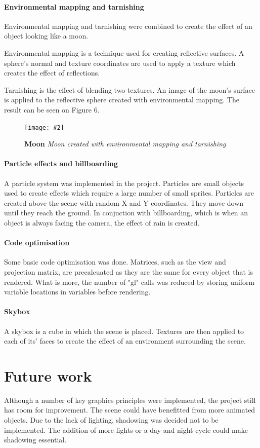 \documentclass[10pt, a4paper]{article}
\newcommand{\figuremacro}[5]{
    \begin{figure}[#1]
        \centering
        \texttt{[image: \#2]}
        \caption[#3]{\textbf{#3}#4}
        \label{fig:#2}
    \end{figure}
}
\begin{document}
    \paragraph{Environmental mapping and tarnishing} Environmental mapping and tarnishing were combined to create the effect of an object looking like a moon.

    Environmental mapping is a technique used for creating reflective surfaces. A sphere's normal and texture coordinates are used to apply a texture which creates the effect of reflections.

    Tarnishing is the effect of blending two textures. An image of the moon's surface is applied to the reflective sphere created with environmental mapping. The result can be seen on Figure 6.

    \figuremacro{h}{moon.png}{Moon}{ \textit{Moon created with environmental mapping and tarnishing} }{1.0}

    \paragraph {Particle effects and billboarding} A particle system was implemented in the project. Particles are small objects used to create effects which require a large number of small sprites. Particles are created above the scene with random X and Y coordinates. They move down until they reach the ground. In conjuction with billboarding, which is when an object is always facing the camera, the effect of rain is created.

    \paragraph{Code optimisation} Some basic code optimisation was done. Matrices, such as the view and projection matrix, are precalcuated as they are the same for every object that is rendered. What is more, the number of "gl" calls was reduced by storing uniform variable locations in variables before rendering.

    \paragraph{Skybox} A skybox is a cube in which the scene is placed. Textures are then applied to each of its' faces to create the effect of an environment surrounding the scene.

    \section{Future work}
	  Although a number of key graphics principles were implemented, the project still has room for improvement.
    The scene could have benefitted from more animated objects.
    Due to the lack of lighting, shadowing was decided not to be implemented. The addition of more lights or a day and night cycle could make shadowing essential.
\end{document}
